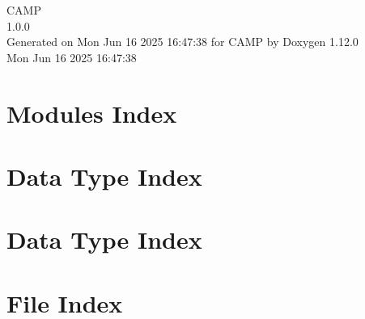 \documentclass[twoside]{book}
\newcommand{\+}{\discretionary{\mbox{\scriptsize$\hookleftarrow$}}{}{}}
\newcommand{\clearemptydoublepage}{%
    \newpage{\pagestyle{empty}\cleardoublepage}%
  }
\begin{document}
  \raggedbottom
    \hypersetup{pageanchor=false,
                bookmarksnumbered=true,
                pdfencoding=unicode
               }
  \begin{titlepage}
  \vspace*{7cm}
  \begin{center}%
  {\Large CAMP}\\
  [1ex]\large 1.\+0.\+0 \\
  \vspace*{1cm}
  {\large Generated on Mon Jun 16 2025 16\+:47\+:38 for CAMP by Doxygen 1.12.0}\\
    \vspace*{0.5cm}
    {\small Mon Jun 16 2025 16:47:38}
  \end{center}
  \end{titlepage}
  \clearemptydoublepage
  \tableofcontents
  \clearemptydoublepage
  \hypersetup{pageanchor=true}















\chapter{Modules Index}

\chapter{Data Type Index}

\chapter{Data Type Index}

\chapter{File Index}

\end{document}
